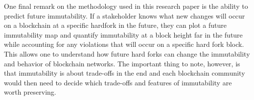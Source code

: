 \documentclass{article}
\begin{document}
One final remark on the methodology used in this research paper is the ability to predict future immutability. If a stakeholder knows what new changes will occur on a blockchain at a specific hardfork in the future, they can plot a future immutability map and quantify immutability at a block height far in the future while accounting for any violations that will occur on a specific hard fork block. This allows one to understand how future hard forks can change the immutability and behavior of blockchain networks. The important thing to note, however, is that immutability is about trade-offs in the end and each blockchain community would then need to decide which trade-offs and features of immutability are worth preserving.

  

\end{document}

